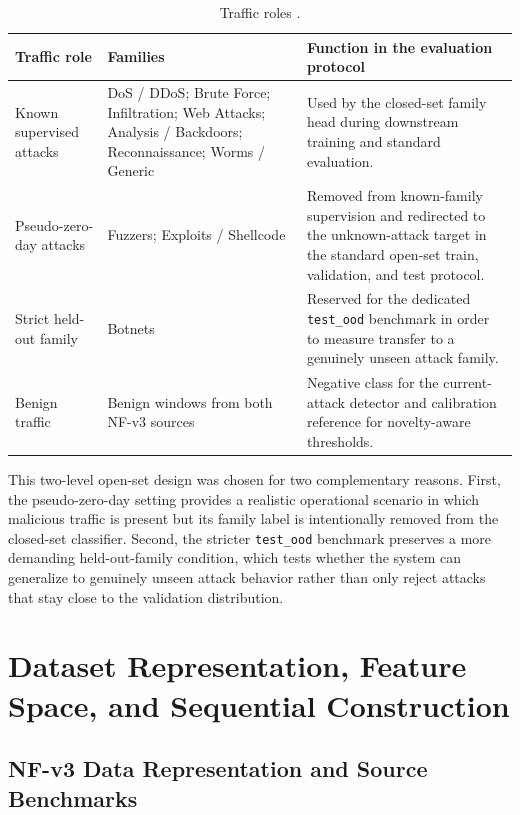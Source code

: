 \documentclass[12pt, a4paper]{report}
\begin{document}
\begin{table}[H]
    \centering
    \small
    \caption{Traffic roles .}
    \label{tab:contribnew_attack_roles}
    \begin{tabularx}{\textwidth}{p{3.1cm} X X}
        \toprule
        Traffic role & Families & Function in the evaluation protocol \\
        \midrule
        Known supervised attacks & DoS / DDoS; Brute Force; Infiltration; Web Attacks; Analysis / Backdoors; Reconnaissance; Worms / Generic & Used by the closed-set family head during downstream training and standard evaluation. \\
        Pseudo-zero-day attacks & Fuzzers; Exploits / Shellcode & Removed from known-family supervision and redirected to the unknown-attack target in the standard open-set train, validation, and test protocol. \\
        Strict held-out family & Botnets & Reserved for the dedicated \texttt{test\_ood} benchmark in order to measure transfer to a genuinely unseen attack family. \\
        Benign traffic & Benign windows from both NF-v3 sources & Negative class for the current-attack detector and calibration reference for novelty-aware thresholds. \\
        \bottomrule
    \end{tabularx}
\end{table}

This two-level open-set design was chosen for two complementary reasons. First, the pseudo-zero-day setting provides a realistic operational scenario in which malicious traffic is present but its family label is intentionally removed from the closed-set classifier. Second, the stricter \texttt{test\_ood} benchmark preserves a more demanding held-out-family condition, which tests whether the system can generalize to genuinely unseen attack behavior rather than only reject attacks that stay close to the validation distribution.

\section{Dataset Representation, Feature Space, and Sequential Construction}

\subsection{NF-v3 Data Representation and Source Benchmarks}
\end{document}
